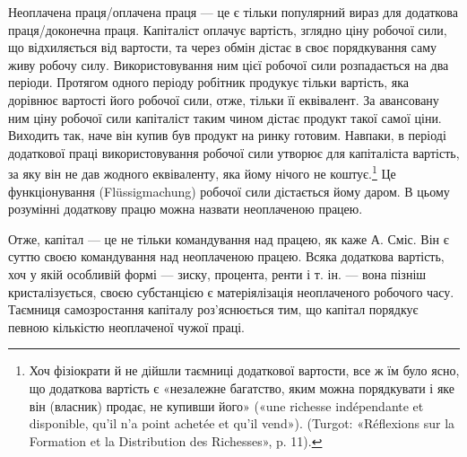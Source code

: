 Неоплачена праця/оплачена праця — це є тільки популярний вираз для
додаткова праця/доконечна праця. Капіталіст оплачує вартість, зглядно ціну
робочої сили, що відхиляється від вартости, та через обмін дістає в своє порядкування саму живу
робочу силу. Використовування ним цієї робочої сили розпадається на два періоди. Протягом одного
періоду робітник продукує тільки вартість,
яка дорівнює вартості його робочої сили, отже, тільки її еквівалент.
За авансовану ним ціну робочої сили капіталіст таким
чином дістає продукт такої самої ціни. Виходить так, наче він
купив був продукт на ринку готовим. Навпаки, в періоді додаткової
праці використовування робочої сили утворює для капіталіста
вартість, за яку він не дав жодного еквіваленту, яка
йому нічого не коштує.\footnote{
Хоч фізіократи й не дійшли таємниці додаткової вартости, все ж
їм було ясно, що додаткова вартість є «незалежне багатство, яким можна
порядкувати і яке він (власник) продає, не купивши його» («une richesse
indépendante et disponible, qu’il n’a point achetée et qu'il vend»). (Turgot:
«Réflexions sur la Formation et la Distribution des Richesses», p. 11).
} Це функціонування (Flüssigmachung)
робочої сили дістається йому даром. В цьому розумінні додаткову
працю можна назвати неоплаченою працею.

Отже, капітал — це не тільки командування над працею,
як каже А. Сміс. Він є суттю своєю командування над неоплаченою
працею. Всяка додаткова вартість, хоч у якій особливій
формі — зиску, процента, ренти і т. ін. — вона пізніш кристалізується,
своєю субстанцією є матеріялізація неоплаченого робочого
часу. Таємниця самозростання капіталу роз’яснюється тим,
що капітал порядкує певною кількістю неоплаченої чужої праці.